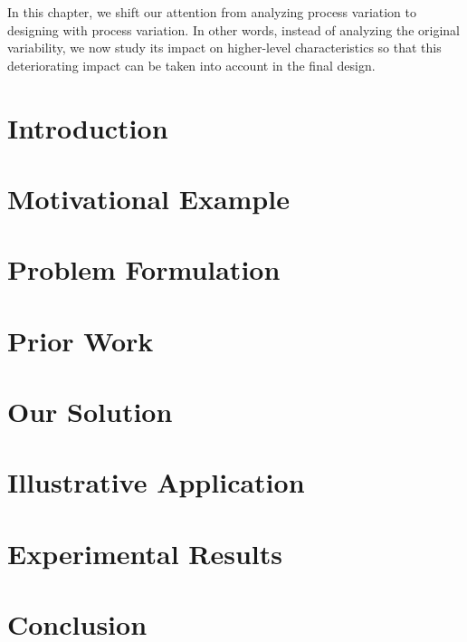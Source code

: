 In this chapter, we shift our attention from analyzing process variation to
designing with process variation. In other words, instead of analyzing the
original variability, we now study its impact on higher-level characteristics so
that this deteriorating impact can be taken into account in the final design.

\section{Introduction}

\section{Motivational Example}

\section{Problem Formulation}

\section{Prior Work}

\section{Our Solution}

\section{Illustrative Application}

\section{Experimental Results}

\section{Conclusion}
